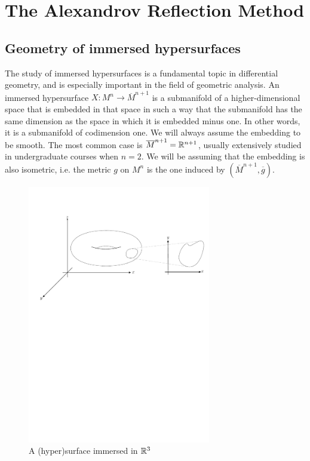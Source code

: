 \chapter{The Alexandrov Reflection Method}

\section{Geometry of immersed hypersurfaces}


The study of immersed hypersurfaces is a fundamental topic in differential geometry, and is especially important in the field of geometric analysis. An immersed hypersurface $X: M^n \rightarrow \overline{M}^{n+1}$ is a submanifold of a higher-dimensional space that is embedded in that space in such a way that the submanifold has the same dimension as the space in which it is embedded minus one. In other words, it is a submanifold of codimension one. We will always assume the embedding to be smooth. The most common case is $\overline{M}^{n+1}=\mathbb{R}^{n+1}$, usually extensively studied in undergraduate courses when $n=2$. We will be assuming that the embedding is also isometric, i.e. the metric $g$ on $M^n$ is the one induced by $(\overline{M}^{n+1}, \overline{g})$. 

\begin{figure}
	\centering
	\includegraphics[width=0.713\textwidth]{figures/1_embedded_manifold}
	\caption{A (hyper)surface immersed in $\mathbb{R}^3$}
\end{figure}

